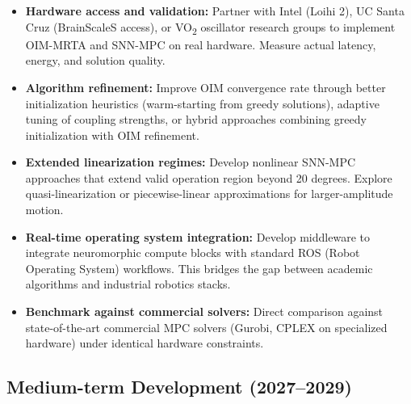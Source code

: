 \begin{itemize}
\item \textbf{Hardware access and validation:} Partner with Intel (Loihi 2), UC Santa Cruz (BrainScaleS access), or VO\textsubscript{2} oscillator research groups to implement OIM-MRTA and SNN-MPC on real hardware. Measure actual latency, energy, and solution quality.

\item \textbf{Algorithm refinement:} Improve OIM convergence rate through better initialization heuristics (warm-starting from greedy solutions), adaptive tuning of coupling strengths, or hybrid approaches combining greedy initialization with OIM refinement.

\item \textbf{Extended linearization regimes:} Develop nonlinear SNN-MPC approaches that extend valid operation region beyond 20 degrees. Explore quasi-linearization or piecewise-linear approximations for larger-amplitude motion.

\item \textbf{Real-time operating system integration:} Develop middleware to integrate neuromorphic compute blocks with standard ROS (Robot Operating System) workflows. This bridges the gap between academic algorithms and industrial robotics stacks.

\item \textbf{Benchmark against commercial solvers:} Direct comparison against state-of-the-art commercial MPC solvers (Gurobi, CPLEX on specialized hardware) under identical hardware constraints.
\end{itemize}

\subsection{Medium-term Development (2027--2029)}

